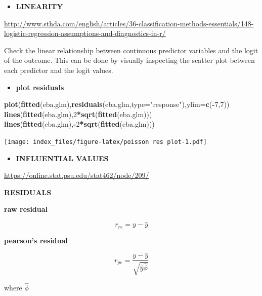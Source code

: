 \documentclass[
]{article}
\newenvironment{Shaded}{\begin{snugshade}}{\end{snugshade}}
\newcommand{\DataTypeTok}[1]{\textcolor[rgb]{0.13,0.29,0.53}{#1}}
\newcommand{\DecValTok}[1]{\textcolor[rgb]{0.00,0.00,0.81}{#1}}
\newcommand{\KeywordTok}[1]{\textcolor[rgb]{0.13,0.29,0.53}{\textbf{#1}}}
\newcommand{\NormalTok}[1]{#1}
\newcommand{\OperatorTok}[1]{\textcolor[rgb]{0.81,0.36,0.00}{\textbf{#1}}}
\newcommand{\StringTok}[1]{\textcolor[rgb]{0.31,0.60,0.02}{#1}}
\providecommand{\tightlist}{%
  \setlength{\itemsep}{0pt}\setlength{\parskip}{0pt}}
\begin{document}
\begin{itemize}
\tightlist
\item
  \textbf{LINEARITY}
\end{itemize}

\url{http://www.sthda.com/english/articles/36-classification-methods-essentials/148-logistic-regression-assumptions-and-diagnostics-in-r/}

Check the linear relationship between continuous predictor variables and
the logit of the outcome. This can be done by visually inspecting the
scatter plot between each predictor and the logit values.

\begin{itemize}
\tightlist
\item
  \textbf{plot residuals}
\end{itemize}

\begin{Shaded}
\begin{Highlighting}[]
\KeywordTok{plot}\NormalTok{(}\KeywordTok{fitted}\NormalTok{(eba.glm),}\KeywordTok{residuals}\NormalTok{(eba.glm,}\DataTypeTok{type=}\StringTok{"response"}\NormalTok{),}\DataTypeTok{ylim=}\KeywordTok{c}\NormalTok{(}\OperatorTok{-}\DecValTok{7}\NormalTok{,}\DecValTok{7}\NormalTok{)) }
\KeywordTok{lines}\NormalTok{(}\KeywordTok{fitted}\NormalTok{(eba.glm),}\DecValTok{2}\OperatorTok{*}\KeywordTok{sqrt}\NormalTok{(}\KeywordTok{fitted}\NormalTok{(eba.glm))) }
\KeywordTok{lines}\NormalTok{(}\KeywordTok{fitted}\NormalTok{(eba.glm),}\OperatorTok{-}\DecValTok{2}\OperatorTok{*}\KeywordTok{sqrt}\NormalTok{(}\KeywordTok{fitted}\NormalTok{(eba.glm)))}
\end{Highlighting}
\end{Shaded}

\texttt{[image: index\_files/figure-latex/poisson res plot-1.pdf]}

\begin{itemize}
\tightlist
\item
  \textbf{INFLUENTIAL VALUES}
\end{itemize}

\url{https://online.stat.psu.edu/stat462/node/209/}

\textbf{RESIDUALS}

\textbf{raw residual}

\[r_{re}= y- \hat{y}\]

\textbf{pearson's residual}

\[r_{pe}=\frac{y-\hat{y}}{\sqrt{\hat{y}\hat{\phi}}}\]

where \(\hat{\phi}\)
\end{document}
